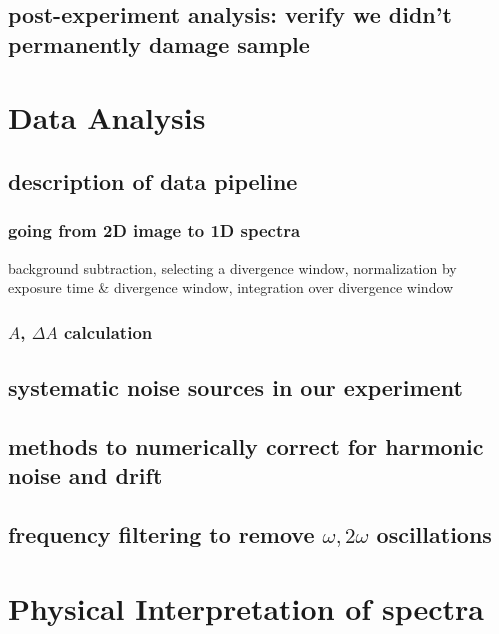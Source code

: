 \subsection{post-experiment analysis: verify we didn't permanently damage sample}

\section{Data Analysis}

\subsection{description of data pipeline}
\subsubsection{going from 2D image to 1D spectra}



background subtraction, selecting a divergence window, normalization by exposure time \& divergence window, integration over divergence window




\subsubsection{$A$, $\Delta A$ calculation}

\subsection{systematic noise sources in our experiment}

\subsection{methods to numerically correct for harmonic noise and drift}

\subsection{frequency filtering to remove $\omega, 2 \omega$ oscillations}

\section{Physical Interpretation of spectra}


